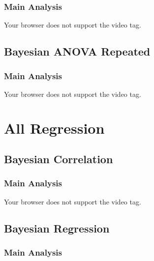 \documentclass[
  letterpaper,
  DIV=11,
  numbers=noendperiod]{scrreprt}
\begin{document}
\hypertarget{main-analysis-7}{%
\subsection{Main Analysis}\label{main-analysis-7}}

Your browser does not support the video tag.

\hypertarget{bayesian-anova-repeated}{%
\section{Bayesian ANOVA Repeated}\label{bayesian-anova-repeated}}

\hypertarget{main-analysis-8}{%
\subsection{Main Analysis}\label{main-analysis-8}}

Your browser does not support the video tag.


\hypertarget{all-regression}{%
\chapter{All Regression}\label{all-regression}}

\hypertarget{bayesian-correlation}{%
\section{Bayesian Correlation}\label{bayesian-correlation}}

\hypertarget{main-analysis-9}{%
\subsection{Main Analysis}\label{main-analysis-9}}

Your browser does not support the video tag.

\hypertarget{bayesian-regression}{%
\section{Bayesian Regression}\label{bayesian-regression}}

\hypertarget{main-analysis-10}{%
\subsection{Main Analysis}\label{main-analysis-10}}
\end{document}

